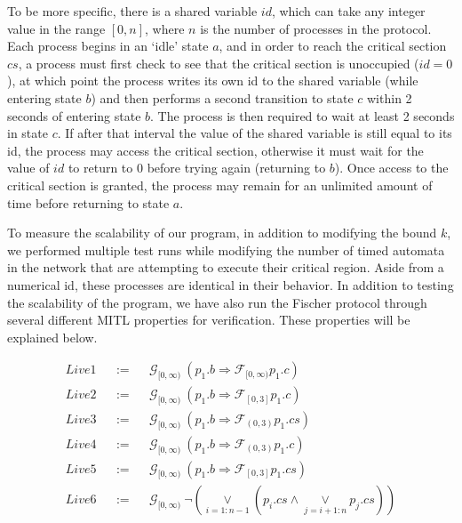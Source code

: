 \documentclass[a4paper,11pt]{report}
\theoremstyle{definition}
\begin{document}
To be more specific, there is a shared variable \(id\), which can take any
integer value in the range \([0,n]\), where \(n\) is the number of processes in the
protocol. Each process begins in an `idle' state \(a\), and in order to reach the
critical section \(cs\), a process must first check to see that the critical
section is unoccupied (\(id=0\)), at which point the process writes its own id to
the shared variable (while entering state \(b\)) and then performs a second
transition to state \(c\) within 2 seconds of entering state \(b\). The process is
then required to wait at least 2 seconds in state \(c\). If after that interval
the value of the shared variable is still equal to its id, the process may access
the critical section, otherwise it must wait for the value of \(id\) to return
to \(0\) before trying again (returning to \(b\)). Once access to the critical
section is granted, the process may remain for an unlimited amount of time before
returning to state \(a\).

To measure the scalability of our program, in addition to modifying the bound
\(k\), we performed multiple test runs while modifying the number of timed
automata in the network that are attempting to execute their critical region.
Aside from a numerical id, these processes are identical in their behavior.
In addition to testing the scalability of the program, we have also run the
Fischer protocol through several different MITL properties for verification.
These properties will be explained below.

\begin{align}
&Live 1 &&:=&& \mathcal{G}_{[0,\infty)}\ (p_1.b \Rightarrow \mathcal{F}_{[0,\infty)}p_1.c) &\nonumber \\
&Live 2 &&:=&& \mathcal{G}_{[0,\infty)}\ (p_1.b \Rightarrow \mathcal{F}_{[0,3]}p_1.c) &\nonumber \\
&Live 3 &&:=&& \mathcal{G}_{[0,\infty)}\ (p_1.b \Rightarrow \mathcal{F}_{(0,3)}p_1.cs) &\nonumber \\
&Live 4 &&:=&& \mathcal{G}_{[0,\infty)}\ (p_1.b \Rightarrow \mathcal{F}_{(0,3)}p_1.c) &\nonumber \\
&Live 5 &&:=&& \mathcal{G}_{[0,\infty)}\ (p_1.b \Rightarrow \mathcal{F}_{[0,3]}p_1.cs) &\nonumber \\
&Live 6 &&:=&& \mathcal{G}_{[0,\infty)}\ \neg (\underset{i=1:n-1}{\lor} (p_i.cs \land \underset{j=i+1:n}{\lor} p_j.cs ))  &\nonumber
\end{align}
\end{document}

